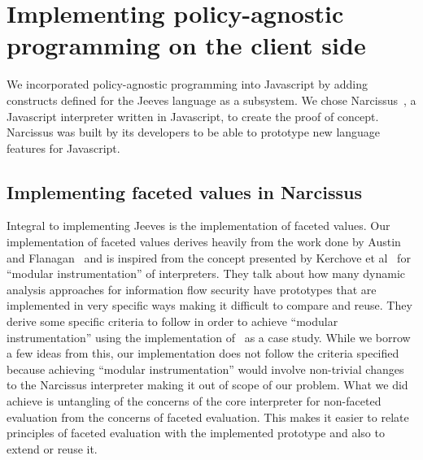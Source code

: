 \chapter{Implementing policy-agnostic programming on the client side\label{chap:solution}}
We incorporated policy-agnostic programming into Javascript by adding constructs
defined for the Jeeves language as a subsystem. We chose Narcissus~\cite{narc},
a Javascript interpreter written in Javascript, to create the proof of concept.
Narcissus was built by its developers to be able to prototype new language features
for Javascript.

\section{Implementing faceted values in Narcissus}
Integral to implementing Jeeves is the implementation of faceted values. Our implementation
of faceted values derives heavily from the work done by Austin and Flanagan~\cite{Faceted}
and is inspired from the concept presented by Kerchove et al~\cite{Modular} for
``modular instrumentation'' of interpreters. They talk about how many dynamic analysis
approaches for information flow security have prototypes that are implemented in
very specific ways making it difficult to compare and reuse. They derive some
specific criteria to follow in order to achieve ``modular instrumentation'' using
the implementation of~\cite{Faceted} as a case study. While we borrow a few ideas
from this, our implementation does not follow the criteria specified because achieving
``modular instrumentation'' would involve non-trivial changes to the Narcissus
interpreter making it out of scope of our problem. What we did achieve is untangling
of the concerns of the core interpreter for non-faceted evaluation from the concerns
of faceted evaluation. This makes it easier to relate principles of faceted evaluation
with the implemented prototype and also to extend or reuse it.

